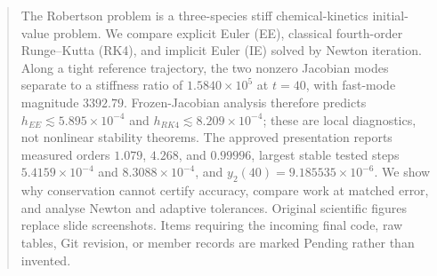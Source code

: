 \begin{abstract}
The Robertson problem is a three-species stiff chemical-kinetics initial-value problem. We compare explicit Euler (EE), classical fourth-order Runge--Kutta (RK4), and implicit Euler (IE) solved by Newton iteration. Along a tight reference trajectory, the two nonzero Jacobian modes separate to a stiffness ratio of $1.5840\times10^5$ at $t=40$, with fast-mode magnitude $3392.79$. Frozen-Jacobian analysis therefore predicts $h_{EE}\lesssim5.895\times10^{-4}$ and $h_{RK4}\lesssim8.209\times10^{-4}$; these are local diagnostics, not nonlinear stability theorems. The approved presentation reports measured orders $1.079$, $4.268$, and $0.99996$, largest stable tested steps $5.4159\times10^{-4}$ and $8.3088\times10^{-4}$, and $y_2(40)=9.185535\times10^{-6}$. We show why conservation cannot certify accuracy, compare work at matched error, and analyse Newton and adaptive tolerances. Original scientific figures replace slide screenshots. Items requiring the incoming final code, raw tables, Git revision, or member records are marked Pending rather than invented.
\end{abstract}
